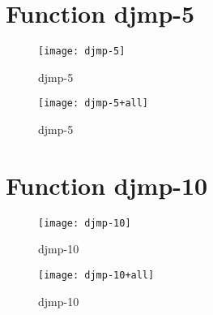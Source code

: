 \newpage

\section{Function djmp-5}

\begin{center}

\end{center}

\begin{center}

\end{center}

\begin{figure}[h]
\begin{center}
\texttt{[image: djmp-5]}
\caption{djmp-5}
\end{center}
\end{figure}

\begin{figure}[h]
\begin{center}
\texttt{[image: djmp-5+all]}
\caption{djmp-5}
\end{center}
\end{figure}

\newpage

\section{Function djmp-10}

\begin{center}

\end{center}

\begin{center}

\end{center}

\begin{figure}[h]
\begin{center}
\texttt{[image: djmp-10]}
\caption{djmp-10}
\end{center}
\end{figure}

\begin{figure}[h]
\begin{center}
\texttt{[image: djmp-10+all]}
\caption{djmp-10}
\end{center}
\end{figure}

\newpage


